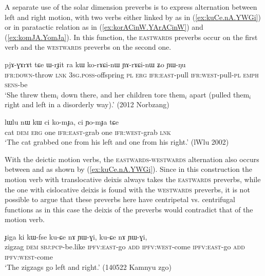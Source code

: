 A separate use of the solar dimension preverbs is to express alternation between left and right motion, with two verbs either linked by  as in (\ref{ex:kuCe.nA.YWGi}) or in paratactic relation as in (\ref{ex:korACinW.YArACinW}) and (\ref{ex:komJA.YomJa}). In this function, the \textsc{eastwards} preverbs occur on the first verb and the \textsc{westwards} preverbs on the second one. 

\begin{exe}
\ex \label{ex:korACinW.YArACinW}
\gll pjɤ-ɣɤrɤt tɕe ɯ-rɟit ra kɯ ko-rɤɕi-nɯ ɲɤ-rɤɕi-nɯ ʑo ɲɯ-ŋu \\
\textsc{ifr}:\textsc{down}-throw \textsc{lnk} \textsc{3sg}.\textsc{poss}-offspring \textsc{pl} \textsc{erg} \textsc{ifr}:\textsc{east}-pull \textsc{ifr}:\textsc{west}-pull-\textsc{pl} \textsc{emph} \textsc{sens}-be \\
\glt `She threw them$_i$ down there, and her children tore them$_i$  apart (pulled them$_i$  right and left in a disorderly way).' (2012 Norbzang) 
\end{exe} 

\begin{exe}
\ex \label{ex:komJA.YomJa}
\gll   lɯlu nɯ kɯ ci ko-mɟa, ci ɲo-mɟa tɕe  \\
 cat \textsc{dem} \textsc{erg} one \textsc{ifr}:\textsc{east}-grab one \textsc{ifr}:\textsc{west}-grab \textsc{lnk}  \\
\glt `The cat grabbed one from his left and one from his right.' (lWlu 2002)
\end{exe} 
 
With the deictic motion verbs, the \textsc{eastwards}-\textsc{westwards} alternation also occurs between  and   as shown by (\ref{ex:kuCe.nA.YWGi}). Since in this construction the motion verb with translocative deixis always takes the \textsc{eastwards} preverbs, while the one with cislocative deixis is found with the \textsc{westwards} preverbs, it is not possible to argue that these preverbs here have centripetal vs. centrifugal functions as in this case the deixis of the preverbs would contradict that of the motion verb.
 
 \begin{exe}
\ex \label{ex:kuCe.nA.YWGi}
\gll ɟiga ki kɯ-fse ku-ɕe nɤ ɲɯ-ɣi, ku-ɕe nɤ ɲɯ-ɣi,  \\
zigzag \textsc{dem} \textsc{sbj}:\textsc{pcp}-be.like \textsc{ipfv}:\textsc{east}-go \textsc{add} \textsc{ipfv}:\textsc{west}-come \textsc{ipfv}:\textsc{east}-go \textsc{add} \textsc{ipfv}:\textsc{west}-come \\ 
\glt `The zigzags go left and right.' (140522 Kamnyu zgo) 	
\end{exe} 

